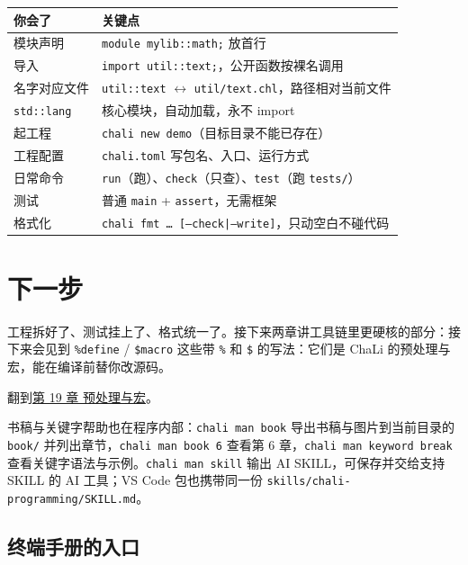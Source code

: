 \begin{center}
\begin{tabular}{ll}
\toprule
你会了 & 关键点 \\
\midrule
模块声明 & \texttt{module mylib:\allowbreak{}:\allowbreak{}math;} 放首行 \\
导入 & \texttt{import util:\allowbreak{}:\allowbreak{}text;}，公开函数按裸名调用 \\
名字对应文件 & \texttt{util:\allowbreak{}:\allowbreak{}text} \ensuremath{\leftrightarrow} \texttt{util/\allowbreak{}text.\allowbreak{}chl}，路径相对当前文件 \\
\texttt{std:\allowbreak{}:\allowbreak{}lang} & 核心模块，自动加载，永不 import \\
起工程 & \texttt{chali new demo}（目标目录不能已存在） \\
工程配置 & \texttt{chali.\allowbreak{}toml} 写包名、入口、运行方式 \\
日常命令 & \texttt{run}（跑）、\texttt{check}（只查）、\texttt{test}（跑 \texttt{tests/\allowbreak{}}） \\
测试 & 普通 \texttt{main} + \texttt{assert}，无需框架 \\
格式化 & \texttt{chali fmt … [\allowbreak{}--check|--write]\allowbreak{}}，只动空白不碰代码 \\
\bottomrule
\end{tabular}
\end{center}

\section{下一步}

工程拆好了、测试挂上了、格式统一了。接下来两章讲工具链里更硬核的部分：接下来会见到 \texttt{\%define} / \texttt{\$macro} 这些带 \texttt{\%} 和 \texttt{\$} 的写法：它们是 ChaLi 的预处理与宏，能在编译前替你改源码。

翻到\hyperref[ch:19]{第 19 章 预处理与宏}。

书稿与关键字帮助也在程序内部：\texttt{chali man book} 导出书稿与图片到当前目录的 \texttt{book/\allowbreak{}} 并列出章节，\texttt{chali man book 6} 查看第 6 章，\texttt{chali man keyword break} 查看关键字语法与示例。\texttt{chali man skill} 输出 AI SKILL，可保存并交给支持 SKILL 的 AI 工具；VS Code 包也携带同一份 \texttt{skills/\allowbreak{}chali-programming/\allowbreak{}SKILL.\allowbreak{}md}。

\subsection*{终端手册的入口}


